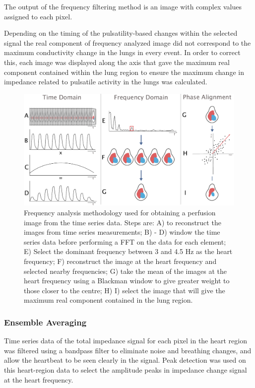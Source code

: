 The output of the frequency filtering method is an 
image with complex values assigned to each pixel.  

Depending on the timing of the pulsatility-based changes within the selected signal
the real component of frequency analyzed image 
did not correspond to the maximum conductivity 
change in the lungs in every event.
In order to correct this, each image was displayed along the axis 
that gave the maximum real component contained
within the lung region to ensure
the maximum change in impedance related to pulsatile activity in the lungs was calculated.

\begin{figure}[H]
\includegraphics[width=\textwidth]{chapter3-perfusion_analysis/imgs/fig-methodsFrequency.pdf}
\caption[Frequency analysis methods]{
Frequency analysis methodology used for obtaining a perfusion image 
from the time series data. Steps are: 
A) to reconstruct the images from time series measurements; 
B) - D) window the time series data before performing a 
FFT on the data for each element; 
E) Select the dominant frequency between 3 and 4.5 Hz as the heart frequency;
F) reconstruct the image at the heart frequency and selected nearby frequencies; 
G) take the mean of the images at the heart frequency using a Blackman window 
to give greater weight to those closer to the centre; 
H) I) select the image that will give the maximum real component contained
in the lung region.
}
\label{fig:freqAnalysis}
\end{figure}

\subsubsection{Ensemble Averaging}

Time series data of the total impedance signal for each pixel in the heart region was filtered 
using a bandpass filter to eliminate noise and breathing changes, 
and allow the heartbeat to be seen clearly in the signal.
Peak detection was used on this heart-region data
to select the amplitude peaks in impedance change
signal at the heart frequency.

